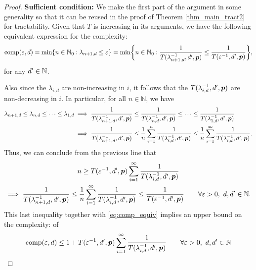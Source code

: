 \documentclass[11pt,a4paper]{article}
\begin{document}
\begin{proof}
\textbf{Sufficient condition:}\newline
We make the first part of the argument in some generality so that it can be reused in the proof of Theorem \ref{thm_main_tract2} for tractability.  Given that $T$ is increasing in its arguments, we have the following equivalent expression for the complexity:
    \begin{equation} \label{eq:comp_equiv}
    \operatorname{comp}(\varepsilon, d) = \min \{n \in \mathbb{N}_{0} : \lambda_{n+1, d} \le \varepsilon\} = \min \biggl\{n \in \mathbb{N}_{0} : \frac{1}{T(\lambda_{n+1,d}^{-1},d',\boldsymbol{p})}\le \frac{1}{T(\varepsilon^{-1},d',\boldsymbol{p}) }\biggr\},
\end{equation}
for any $d' \in \mathbb{N}$.

Also since the $\lambda_{i,d}$ are non-increasing in $i$, it follows that the $T(\lambda_{i,d}^{-1},d',\boldsymbol{p})$ are non-decreasing in $i$. In particular, for all $n\in \mathbb{N}$, we have
\begin{align*}
    \lambda_{n+1,d} \le \lambda_{n,d} \le \cdots \le \lambda_{1,d}
    & \implies \frac{1}{T(\lambda_{n+1, d}^{-1},d',\boldsymbol{p})} \le \frac{1}{T(\lambda_{n, d}^{-1},d',\boldsymbol{p})} \le \cdots \le \frac{1}{T(\lambda_{1, d}^{-1},d',\boldsymbol{p})} \\
    & \implies \frac{1}{T(\lambda_{n+1, d}^{-1},d',\boldsymbol{p}) }
    \le \frac 1n \sum_{i=1}^n  \frac{1}{T(\lambda_{i, d}^{-1},d',\boldsymbol{p}) }
    \le \frac 1n \sum_{i=1}^\infty  \frac{1}{T(\lambda_{i, d}^{-1},d',\boldsymbol{p})}.
\end{align*}
Thus, we can conclude from the previous line that
\begin{multline*}
    n \ge T(\varepsilon^{-1},d',\boldsymbol{p}) \sum_{i=1}^\infty \frac{1}{T(\lambda_{i, d}^{-1},d',\boldsymbol{p})} \\
   \implies   \frac{1}{T(\lambda_{n+1, d}^{-1},d',\boldsymbol{p})} \le
   \frac 1n \sum_{i=1}^\infty \frac{1}{T(\lambda_{i, d}^{-1},d',\boldsymbol{p}) } \le \frac{1}{T(\varepsilon^{-1},d',\boldsymbol{p})} \qquad \forall \varepsilon > 0, \ d,d' \in \mathbb{N}.
\end{multline*}
This last inequality together with \eqref{eq:comp_equiv} implies an upper bound on the complexity: of
\begin{equation} \label{eq:compUP}
	\operatorname{comp}(\varepsilon,d)
	\le 1 + T(\varepsilon^{-1},d',\boldsymbol{p}) \sum_{i=1}^\infty \frac{1}{T(\lambda_{i, d}^{-1},d',\boldsymbol{p})} \qquad \forall \varepsilon > 0, \ d, d' \in \mathbb{N}
\end{equation}


\end{proof}
\end{document}
